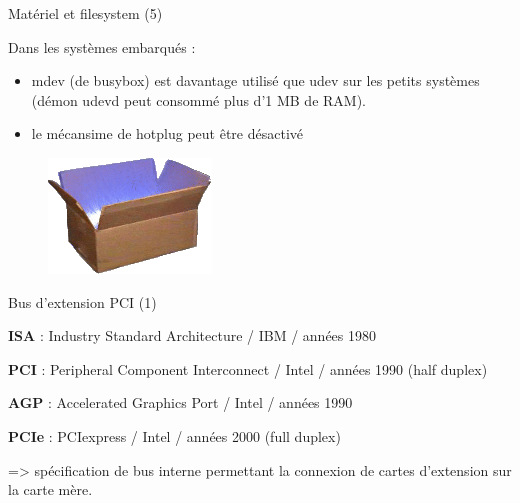 \documentclass[12pt, t]{beamer}
\newcommand{\bi}{\begin{itemize}}
\newcommand{\ei}{\end{itemize}}
\begin{document}
\begin{frame}{Matériel et filesystem (5)}

    \vspace{15pt}
    Dans les systèmes embarqués :
    \vspace{5pt}
    \bi
    \itemsep12pt
    \item mdev (de busybox) est davantage utilisé que udev sur les petits
          systèmes (démon udevd peut consommé plus d'1 MB de RAM).
    \item le mécansime de hotplug peut être désactivé
    \ei

    \vspace{10pt}
    \begin{figure}
        \centering
        \includegraphics[scale=0.5]{busybox.png}
    \end{figure}

\end{frame}

\begin{frame}{Bus d'extension PCI (1)}

    \vspace{15pt}
    {\textbf{ISA}} : Industry Standard Architecture / IBM / années 1980

    \vspace{15pt}
    {\textbf{PCI}} : Peripheral Component Interconnect / Intel / années 1990
                     (half duplex)

    \vspace{15pt}
    {\textbf{AGP}} : Accelerated Graphics Port / Intel / années 1990

    \vspace{15pt}
    {\textbf{PCIe}} : PCIexpress / Intel / années 2000 (full duplex)

    {
        \vspace{15pt}
        => spécification de bus interne permettant la connexion de cartes
        d'extension sur la carte mère.
    }
\end{frame}
\end{document}
